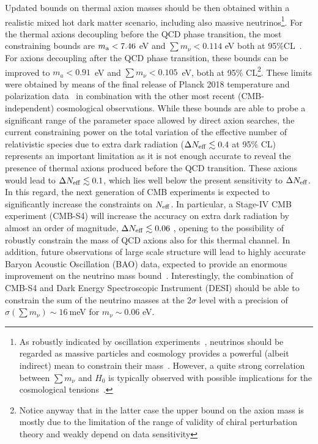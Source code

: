 \documentclass[fleqn,usenatbib,letters]{mnras}
\begin{document}
Updated bounds on thermal axion masses should be then obtained within a realistic mixed hot dark matter scenario, including also massive neutrinos\footnote{As robustly indicated by oscillation experiments~\citep{deSalas:2020pgw,deSalas:2018bym}, neutrinos should be regarded as massive particles and cosmology provides a powerful (albeit indirect) mean to constrain their mass~\citep{deSalas:2018bym,Hagstotz:2020ukm,Vagnozzi:2019utt,Vagnozzi:2018pwo,Vagnozzi:2018jhn,Vagnozzi:2017ovm,Giusarma:2016phn,Bond:1980ha,Doroshkevich:1980zs}. However, a quite strong correlation between $\sum m_{\nu}$ and $H_0$ is typically observed with possible implications for the cosmological tensions~\citep{Capozzi:2021fjo,DiValentino:2021imh}.}. For the thermal axions decoupling before the QCD phase transition, the most constraining bounds are $m_{\rm a}<7.46$ eV and $\sum m_{\nu}<0.114$ eV both at 95\%CL~\citep{Giare:2020vzo}. 
For axions decoupling after the QCD phase transition, these bounds can be improved to $m_a<0.91$~eV and $\sum m_\nu< 0.105$~eV, both at 95\% CL\footnote{Notice anyway that in the latter case the upper bound on the axion mass is mostly due to the limitation of the range of validity of chiral perturbation theory and weakly depend on data sensitivity}. These limits were obtained by means of the final release of Planck 2018 temperature and polarization data~\citep{Akrami:2018vks} in combination with the other most recent (CMB-independent) cosmological observations. While these bounds are able to probe a significant range of the parameter space allowed by direct axion searches, the current constraining power on the total variation of the effective number of relativistic species due to extra dark radiation ($\Delta N_{\rm eff} \lesssim 0.4$ at 95\% CL) represents an important limitation as it is not enough accurate to reveal the presence of thermal axions produced before the QCD transition. These axions would lead to $\Delta N_{\rm eff}\lesssim 0.1$, which lies well below the present sensitivity to $\Delta N_{\rm eff}$. In this regard, the next generation of CMB experiments is expected to significantly increase the constraints on $N_{\rm eff}$. In particular, a Stage-IV CMB experiment (CMB-S4) will increase the accuracy on extra dark radiation by almost an order of magnitude, $\Delta N_{\rm eff} \lesssim 0.06$ \citep{Abazajian:2016yjj}, opening to the possibility of robustly constrain the mass of QCD axions also for this thermal channel. In addition, future observations of large scale structure will lead to highly accurate Baryon Acoustic Oscillation (BAO) data, expected to provide an enormous improvement on the neutrino mass bound~\citep{DESI}.  Interestingly, the combination of CMB-S4 and Dark Energy Spectroscopic Instrument (DESI) should be able to constrain the sum of the neutrino masses at the $2\sigma$ level with a precision of $\sigma(\sum m_\nu) \sim 16\ $meV \citep{constraint_neutrino_stageIV,Xu:2020fyg} for $m_{\nu} \sim 0.06 $ eV.
\end{document}
